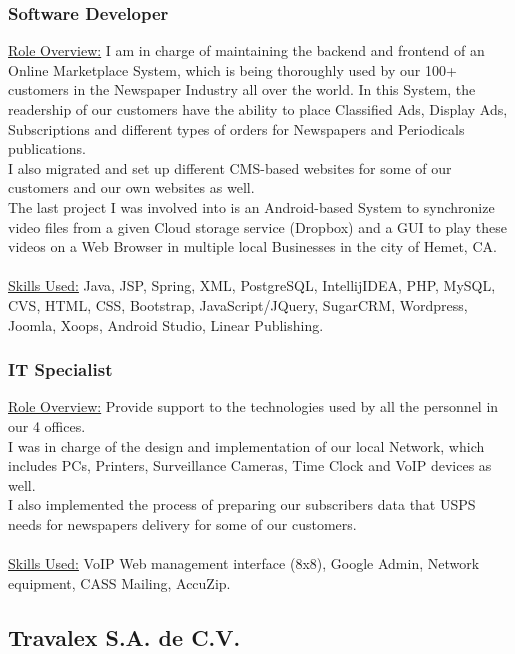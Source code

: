 \documentclass[letterpaper, 11pt]{article}
\begin{document}
	\subsubsection*{Software Developer}
	\underline{Role Overview:} 
	I am in charge of maintaining the backend and frontend of an Online Marketplace System, which is being thoroughly used by our 100+ customers in the Newspaper Industry all over the world. In this System, the readership of our customers have the ability to place Classified Ads, Display Ads, Subscriptions and different types of orders for Newspapers and Periodicals publications.\\

I also migrated and set up different CMS-based websites for some of our customers and our own websites as well.\\

The last project I was involved into is an Android-based System to synchronize video files from a given Cloud storage service (Dropbox) and a GUI to play these videos on a Web Browser in multiple local Businesses in the city of Hemet, CA.\\\\
	\underline{Skills Used:}
	 Java, JSP, Spring, XML, PostgreSQL, IntellijIDEA, PHP, MySQL, CVS, HTML, CSS, Bootstrap, JavaScript/JQuery, SugarCRM, Wordpress, Joomla, Xoops, Android Studio, Linear Publishing.
	\subsubsection*{IT Specialist}
	\underline{Role Overview:} 
	Provide support to the technologies used by all the personnel in our 4 offices. \\
I was in charge of the design and implementation of our local Network, which includes PCs, Printers, Surveillance Cameras, Time Clock and VoIP devices as well.\\

I also implemented the process of preparing our subscribers data that USPS needs for newspapers delivery for some of our customers.\\\\
	\underline{Skills Used:}
	VoIP Web management interface (8x8), Google Admin, Network equipment, CASS Mailing, AccuZip.
	\subsection*{\LARGE{\textbf{Travalex S.A. de C.V.}}}
\end{document}
